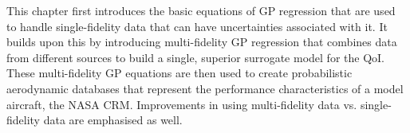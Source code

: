 This chapter first introduces the basic equations of GP regression that are used to handle single-fidelity data that can have uncertainties associated with it.
It builds upon this by introducing multi-fidelity GP regression that combines data from different sources to build a single, superior surrogate model for the QoI.
These multi-fidelity GP equations are then used to create probabilistic aerodynamic databases that represent the performance characteristics of a model aircraft, the NASA CRM. 
Improvements in using multi-fidelity data vs. single-fidelity data are emphasised as well.